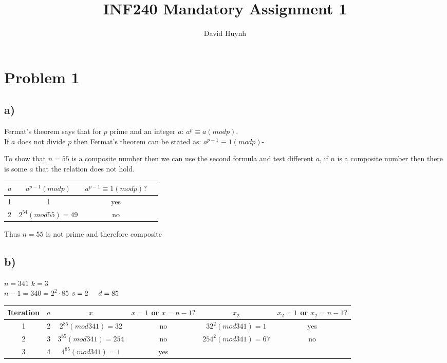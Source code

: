 \documentclass{article}
\begin{document}
\title{INF240 Mandatory Assignment 1}
\author{David Huynh}

\maketitle

\section*{Problem 1}

\subsection*{a)}
Fermat's theorem says that for $p$ prime and an integer $a$: $a^{p} \equiv a (mod p)$.\\
If $a$ does not divide $p$ then Fermat's theorem can be stated as: $a^{p-1} \equiv 1 (mod p)$-

To show that $n=55$ is a composite number then we can use the second formula and test different $a$, if $n$ is a composite number then there is some $a$ that the relation does not hold.

\begin{tabular}{l | c | c | r}
$a$ & $a^{p-1} (mod p)$ & $a^{p-1} \equiv 1 (mod p)?$ \\ \hline

1 & 1 & yes\\
2 & $2^{54} (mod 55) = 49$ & no
\end{tabular}

Thus $n=55$ is not prime and therefore composite

\subsection*{b)}

$n=341$ \hspace{5 mm} $k=3$\\
$n-1=340= 2^{2} \cdotp 85$ \hspace{5 mm} $s=2 \hspace{5mm} d=85$

\begin{tabular}{c | c | c | c | c | c}
Iteration & $a$ & $x$ & $x=1$ or $x=n-1?$ & $x_{2}$ & $x_{2}=1$ or $x_{2}=n-1?$\\ \hline

1 & 2 & $2^{85} (mod 341) = 32$ & no & $32^{2} (mod 341) = 1$ & yes\\
2 & 3 & $3^{85} (mod 341) = 254$ & no & $254^{2} (mod 341) = 67$ & no\\
3 & 4 & $4^{85} (mod 341) = 1$ & yes &  &
\end{tabular}
\end{document}
